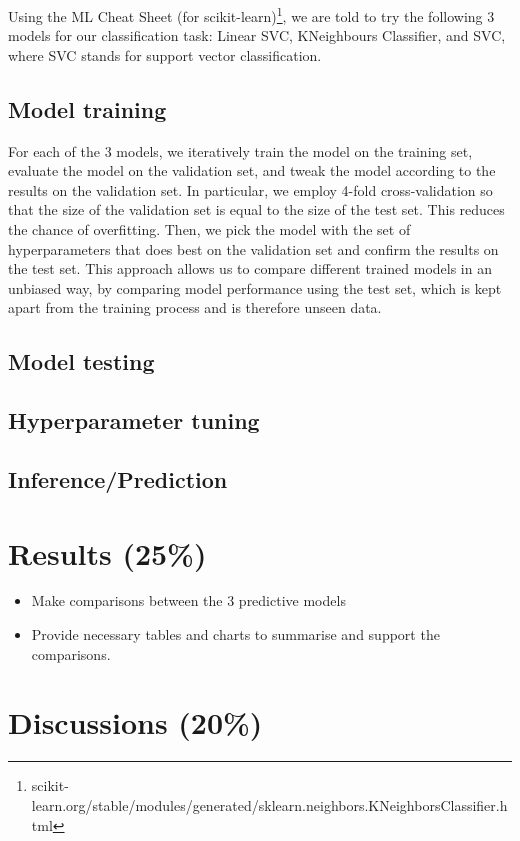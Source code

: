 \documentclass[twoside,11pt]{article}
\begin{document}
Using the ML Cheat Sheet (for scikit-learn)\footnote{scikit-learn.org/stable/modules/generated/sklearn.neighbors.KNeighborsClassifier.html}, we are told to try the following 3 models for our classification task: Linear SVC, KNeighbours Classifier, and SVC, where SVC stands for support vector classification.

\subsection{Model training}
For each of the 3 models, we iteratively train the model on the training set, evaluate the model on the validation set, and tweak the model according to the results on the validation set. In particular, we employ 4-fold cross-validation so that the size of the validation set is equal to the size of the test set. This reduces the chance of overfitting. Then, we pick the model with the set of hyperparameters that does best on the validation set and confirm the results on the test set. This approach allows us to compare different trained models in an unbiased way, by comparing model performance using the test set, which is kept apart from the training process and is therefore unseen data.

\subsection{Model testing}
\subsection{Hyperparameter tuning}
\subsection{Inference/Prediction}

\section{Results (25\%)}
\begin{itemize}
    \item Make comparisons between the 3 predictive models
    \item Provide necessary tables and charts to summarise and support the comparisons.
\end{itemize}

\section{Discussions (20\%)}
\end{document}
